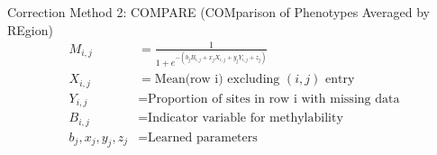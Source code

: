 \documentclass[10pt]{beamer}
\begin{document}
\begin{frame}[fragile]{Correction Method 2: COMPARE (COMparison of
Phenotypes Averaged by REgion)}
\begin{align*}
M_{i,j} &= \frac{1}{1+e^{-(b_jB_{i,j}+x_jX_{i,j}+y_jY_{i,j}+z_j)}}\\
X_{i,j} &= \text{Mean(row i) excluding $(i,j)$ entry}\\
Y_{i,j} &= \text{Proportion of sites in row i with missing data}\\
B_{i,j} &= \text{Indicator variable for methylability}\\
b_j, x_j, y_j, z_j &= \text{Learned parameters}
\end{align*}
\end{frame}
\end{document}
